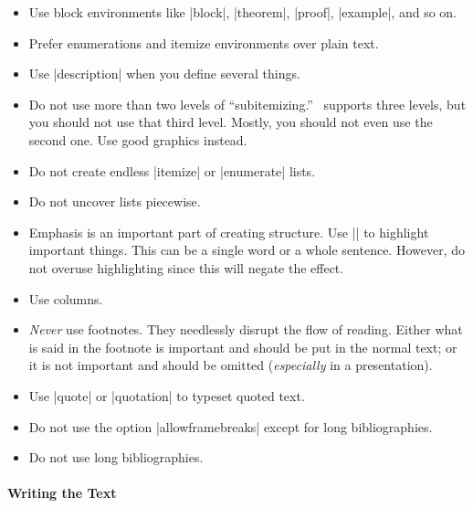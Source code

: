 \begin{itemize}
\item
  Use block environments like |block|, |theorem|, |proof|, |example|, and so on.
\item
  Prefer enumerations and itemize environments over plain text.
\item
  Use |description| when you define several things.
\item
  Do not use more than two levels of ``subitemizing.'' \beamer\ supports three levels, but you should not use that third level. Mostly, you should not even use the second one. Use good graphics instead.
\item
  Do not create endless |itemize| or |enumerate| lists.
\item
  Do not uncover lists piecewise.
\item
  Emphasis is an important part of creating structure. Use |\alert| to highlight important things. This can be a single word or a whole sentence. However, do not overuse highlighting since this will negate the effect.
\item
  Use columns.
\item
  \emph{Never} use footnotes. They needlessly disrupt the flow of reading. Either what is said in the footnote is important and should be put in the normal text; or it is not important and should be omitted (\emph{especially} in a presentation).
\item
  Use |quote| or |quotation| to typeset quoted text.
\item
  Do not use the option |allowframebreaks| except for long bibliographies.
\item
  Do not use long bibliographies.
\end{itemize}

\paragraph{Writing the Text}

